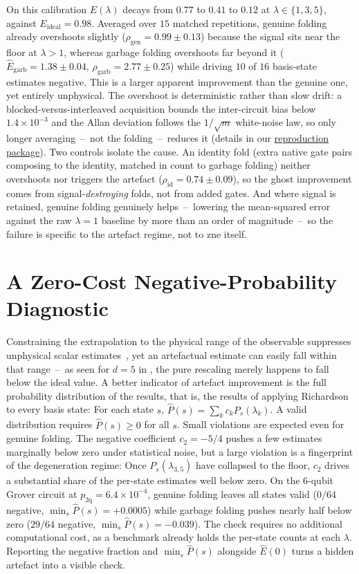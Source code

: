 \documentclass[10pt,conference, letterpaper]{IEEEtran}
\newcommand{\repro}{\href{https://github.com/lfd/qce26_artefactual_improvements_zne}{reproduction package\xspace}}
\begin{document}
On this calibration $E(\lambda)$ decays from $0.77$ to $0.41$ to $0.12$ at $\lambda\in\{1,3,5\}$, against $E_\text{ideal}=0.98$. Averaged over $15$ matched repetitions, genuine folding already overshoots slightly ($\rho_\text{gen}=0.99\pm0.13$) because the signal sits near the floor at $\lambda{>}1$, whereas garbage folding overshoots far beyond it ($\hat E_\text{garb}=1.38\pm0.04$, $\rho_\text{garb}=2.77\pm0.25$) while driving $10$ of $16$ basis-state estimates negative. This is a larger apparent improvement than the genuine one, yet entirely unphysical. The overshoot is deterministic rather than slow drift: a blocked-versus-interleaved acquisition bounds the inter-circuit bias below $1.4\times10^{-3}$ and the Allan deviation follows the $1/\sqrt{m}$ white-noise law, so only longer averaging~--~not the folding~--~reduces it (details in our \repro{}). Two controls isolate the cause. An identity fold (extra native gate pairs composing to the identity, matched in count to garbage folding) neither overshoots nor triggers the artefact ($\rho_\text{id}=0.74\pm0.09$), so the ghost improvement comes from signal-\emph{destroying} folds, not from added gates. And where signal is retained, genuine folding genuinely helps~--~lowering the mean-squared error against the raw $\lambda{=}1$ baseline by more than an order of magnitude~--~so the failure is specific to the artefact regime, not to \gls{zne} itself.

\section{A Zero-Cost Negative-Probability Diagnostic}
\label{sec:diagnostic}
Constraining the extrapolation to the physical range of the observable suppresses unphysical scalar estimates~\cite{miranskyy_improving_2026}, yet an artefactual estimate can easily fall within that range~--~as seen for $d{=}5$ in , the pure rescaling merely happens to fall below the ideal value. A better indicator of artefact improvement is the full probability distribution of the results, that is, the results of applying Richardson to every basis state: For each state $s$, $\hat{P}(s)=\sum_k c_kP_s(\lambda_k)$. A valid distribution requires $\hat{P}(s)\ge0$ for all $s$. Small violations are expected even for genuine folding. The negative coefficient $c_2=-5/4$ pushes a few estimates marginally below zero under statistical noise, but a large violation is a fingerprint of the degeneration regime: Once $P_s(\lambda_{3,5})$ have collapsed to the floor, $c_2$ drives a substantial share of the per-state estimates well below zero. On the 6-qubit Grover circuit at $p_\text{2q}=6.4\times10^{-4}$, genuine folding leaves all states valid ($0/64$ negative, $\min_s\hat{P}(s)=+0.0005$) while garbage folding pushes nearly half below zero ($29/64$ negative, $\min_s\hat{P}(s)=-0.039$). The check requires no additional computational cost, as a benchmark already holds the per-state counts at each $\lambda$. Reporting the negative fraction and $\min_s\hat{P}(s)$ alongside $\hat{E}(0)$ turns a hidden artefact into a visible check.
\end{document}
